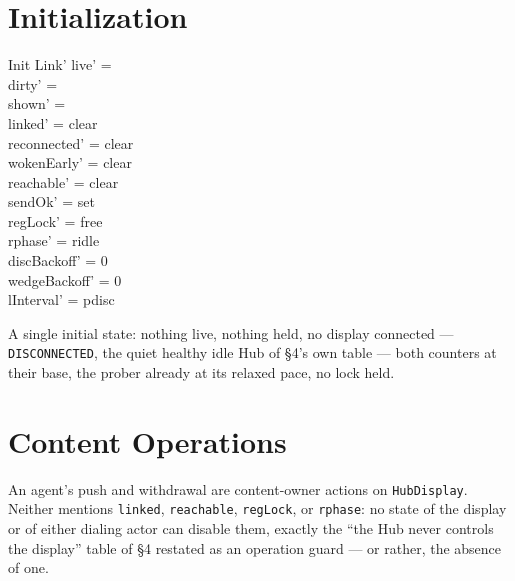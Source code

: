 \documentclass[a4paper,10pt,fleqn]{article}
\begin{document}
\section{Initialization}

\begin{schema}{Init}
  Link'
\where
  live' = \emptyset \\
  dirty' = \emptyset \\
  shown' = \emptyset \\
  linked' = clear \\
  reconnected' = clear \\
  wokenEarly' = clear \\
  reachable' = clear \\
  sendOk' = set \\
  regLock' = free \\
  rphase' = ridle \\
  discBackoff' = 0 \\
  wedgeBackoff' = 0 \\
  lInterval' = pdisc
\end{schema}

A single initial state: nothing live, nothing held, no display connected ---
\texttt{DISCONNECTED}, the quiet healthy idle Hub of \S4's own table ---
both counters at their base, the prober already at its relaxed pace, no
lock held.

\section{Content Operations}

An agent's push and withdrawal are content-owner actions on
\texttt{HubDisplay}.  Neither mentions \texttt{linked}, \texttt{reachable},
\texttt{regLock}, or \texttt{rphase}: no state of the display or of either
dialing actor can disable them, exactly the ``the Hub never controls the
display'' table of \S4 restated as an operation guard --- or rather, the
absence of one.
\end{document}
